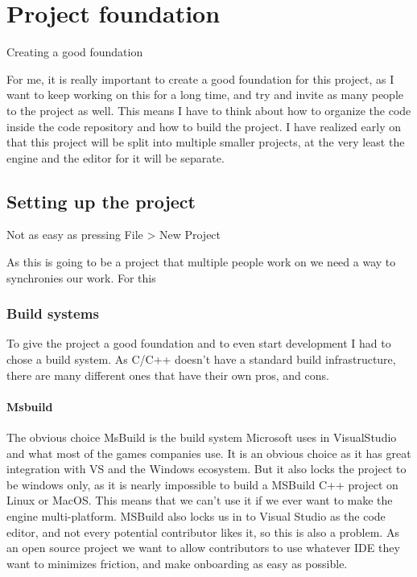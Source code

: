 \chapter{Project foundation}

Creating a good foundation

For me, it is really important to create a good foundation for this project, as I want to keep working on this for a long time, and try and invite as many people to the project as well. This means I have to think about how to organize the code inside the code repository and how to build the project. I have realized early on that this project will be split into multiple smaller projects, at the very least the engine and the editor for it will be separate.

\section{Setting up the project}

Not as easy as pressing File > New Project

As this is going to be a project that multiple people work on we need a way to synchronies our work. For this

\subsection{Build systems}

To give the project a good foundation and to even start development I had to chose a build system. As C/C++ doesn't have a standard build infrastructure, there are many different ones that have their own pros, and cons.

\subsubsection{Msbuild}
The obvious choice
MsBuild is the build system Microsoft uses in VisualStudio and what most of the games companies use.
It is an obvious choice as it has great integration with VS and the Windows ecosystem.
But it also locks the project to be windows only, as it is nearly impossible to build a MSBuild C++ project on Linux or MacOS.
This means that we can't use it if we ever want to make the engine multi-platform.
MSBuild also locks us in to Visual Studio as the code editor, and not every potential contributor likes it, so this is also a problem.
As an open source project we want to allow contributors to use whatever IDE they want to minimizes friction, and make onboarding as easy as possible.

